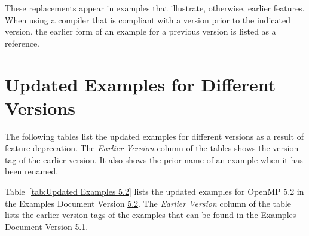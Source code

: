 \linenumbers
These replacements appear in examples that illustrate, otherwise, earlier features.
When using a compiler that is compliant with a version prior to 
the indicated version, the earlier form of an example for a previous
version is listed as a reference.

\newpage
\section{Updated Examples for Different Versions}
\label{sec:Updated Examples}

The following tables list the updated examples for different versions as 
a result of feature deprecation. The \emph{Earlier Version} column of 
the tables shows the version tag of the earlier version. It also shows
the prior name of an example when it has been renamed.

Table~\ref{tab:Updated Examples 5.2} lists the updated examples for OpenMP 5.2
in the Examples Document Version
\href{https://github.com/OpenMP/Examples/tree/v5.2}{5.2}.
The \emph{Earlier Version} column of the table lists the earlier version
tags of the examples that can be found in 
the Examples Document Version 
\href{https://github.com/OpenMP/Examples/tree/v5.1}{5.1}.


